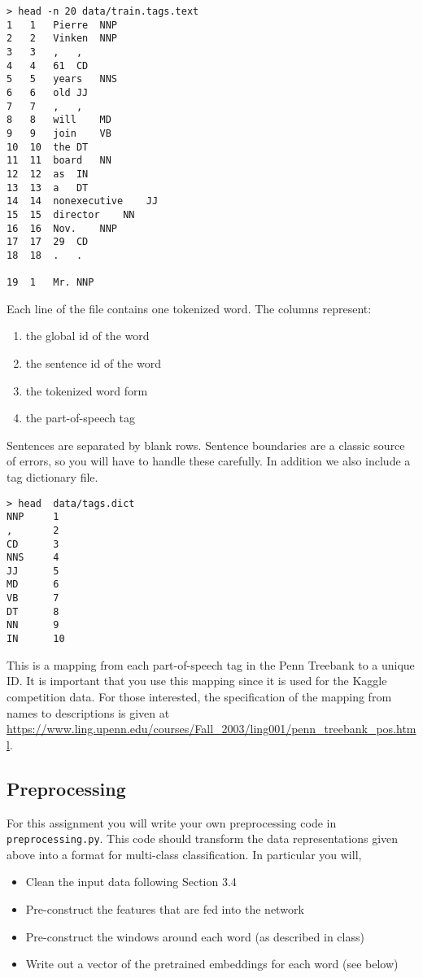 \documentclass[11pt]{article}
\begin{document}
\begin{verbatim}
> head -n 20 data/train.tags.text
1	1	Pierre	NNP
2	2	Vinken	NNP
3	3	,	,
4	4	61	CD
5	5	years	NNS
6	6	old	JJ
7	7	,	,
8	8	will	MD
9	9	join	VB
10	10	the	DT
11	11	board	NN
12	12	as	IN
13	13	a	DT
14	14	nonexecutive	JJ
15	15	director	NN
16	16	Nov.	NNP
17	17	29	CD
18	18	.	.

19	1	Mr.	NNP
\end{verbatim}

\vspace{0.5cm}

Each line of the file contains one tokenized word. The columns represent:

\begin{enumerate}
\item the global id of the word
\item the sentence id of the word
\item the tokenized word form
\item the part-of-speech tag
\end{enumerate}

\noindent Sentences are separated by blank rows. Sentence boundaries are a
classic source of errors, so you will have to handle these carefully. In addition we also include a tag dictionary file. 

\begin{verbatim}
> head  data/tags.dict 
NNP     1
,       2
CD      3
NNS     4
JJ      5
MD      6
VB      7
DT      8
NN      9
IN      10
\end{verbatim}

This is a mapping from each part-of-speech tag in the Penn Treebank to
a unique ID. It is important that you use this mapping since it 
is used for the Kaggle competition data. For those interested, the
specification of the mapping from names to descriptions is given at
\url{https://www.ling.upenn.edu/courses/Fall_2003/ling001/penn_treebank_pos.html}.


\subsection{Preprocessing}

For this assignment you will write your own preprocessing code
in \texttt{preprocessing.py}. This code should transform the
data representations given above into a format for multi-class
classification. In particular you will,

\begin{itemize}
\item Clean the input data following Section 3.4
\item Pre-construct the features that are fed into the network
\item Pre-construct the windows around each word (as described in class)
\item Write out a vector of the pretrained embeddings for each word (see below)
\end{itemize}
\end{document}
